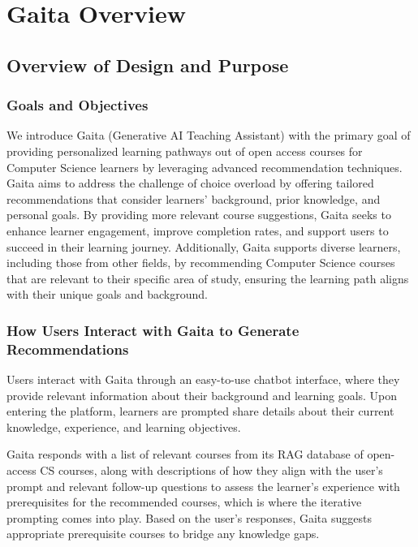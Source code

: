 \chapter{Gaita Overview} \label{chap:chap-3}





\section{Overview of Design and Purpose}

\subsection{Goals and Objectives}
We introduce Gaita (Generative AI Teaching Assistant) with the primary goal of providing personalized learning pathways out of open access courses for Computer Science learners by leveraging advanced recommendation techniques. Gaita aims to address the challenge of choice overload by offering tailored recommendations that consider learners' background, prior knowledge, and personal goals. By providing more relevant course suggestions, Gaita seeks to enhance learner engagement, improve completion rates, and support users to succeed in their learning journey. Additionally, Gaita supports diverse learners, including those from other fields, by recommending Computer Science courses that are relevant to their specific area of study, ensuring the learning path aligns with their unique goals and background.

\subsection{How Users Interact with Gaita to Generate Recommendations}

Users interact with Gaita through an easy-to-use chatbot interface, where they provide relevant information about their background and learning goals. Upon entering the platform, learners are prompted share details about their current knowledge, experience, and learning objectives. 

Gaita responds with a list of relevant courses from its RAG database of open-access CS courses, along with descriptions of how they align with the user’s prompt and relevant follow-up questions to assess the learner's experience with prerequisites for the recommended courses, which is where the iterative prompting comes into play. Based on the user's responses, Gaita suggests appropriate prerequisite courses to bridge any knowledge gaps. 


